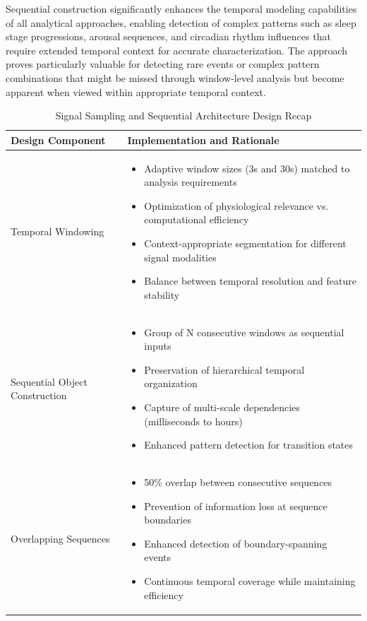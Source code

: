 \documentclass[a4paper,12pt,twoside]{article}
\begin{document}
Sequential construction significantly enhances the temporal modeling capabilities of all analytical approaches, enabling detection of complex patterns such as sleep stage progressions, arousal sequences, and circadian rhythm influences that require extended temporal context for accurate characterization. The approach proves particularly valuable for detecting rare events or complex pattern combinations that might be missed through window-level analysis but become apparent when viewed within appropriate temporal context.

\begin{table}[H]
\centering
\caption{Signal Sampling and Sequential Architecture Design Recap}
\begin{tabular}{|p{3.5cm}|p{10.5cm}|}
\hline
\textbf{Design Component} & \textbf{Implementation and Rationale} \\
\hline
Temporal Windowing & 
\begin{itemize}
  \item Adaptive window sizes (3s and 30s) matched to analysis requirements
  \item Optimization of physiological relevance vs. computational efficiency
  \item Context-appropriate segmentation for different signal modalities 
  \item Balance between temporal resolution and feature stability
\end{itemize} \\
\hline
Sequential Object Construction & 
\begin{itemize}
  \item Group of N consecutive windows as sequential inputs
  \item Preservation of hierarchical temporal organization
  \item Capture of multi-scale dependencies (milliseconds to hours)
  \item Enhanced pattern detection for transition states
\end{itemize} \\
\hline
Overlapping Sequences & 
\begin{itemize}
  \item 50\% overlap between consecutive sequences
  \item Prevention of information loss at sequence boundaries
  \item Enhanced detection of boundary-spanning events
  \item Continuous temporal coverage while maintaining efficiency
\end{itemize} \\
\hline
\end{tabular}
\label{tab:sequential_design_summary}
\end{table}
\end{document}
